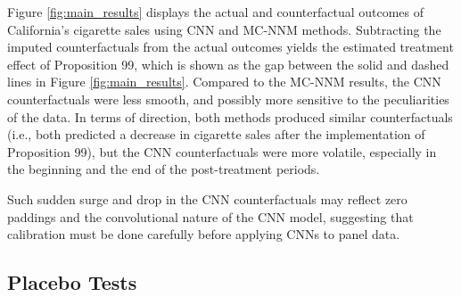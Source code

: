 Figure \ref{fig:main_results} displays the actual and counterfactual outcomes
of California's cigarette sales using CNN and MC-NNM methods.
Subtracting the imputed counterfactuals from the actual outcomes yields the estimated treatment effect of Proposition 99, which is shown as the gap between the solid and dashed lines in Figure \ref{fig:main_results}.
Compared to the MC-NNM results, the CNN counterfactuals were less smooth, and possibly more sensitive to the 
peculiarities of the data.
In terms of direction, both methods produced similar counterfactuals (i.e., both predicted a decrease in cigarette sales after the implementation of Proposition 99),
but the CNN counterfactuals were more volatile, especially in the beginning and the end of the post-treatment periods.

Such sudden surge and drop in the CNN counterfactuals may reflect zero paddings and the convolutional nature of the CNN model,
suggesting that calibration must be done carefully before applying CNNs to panel data.




\subsection{Placebo Tests}

